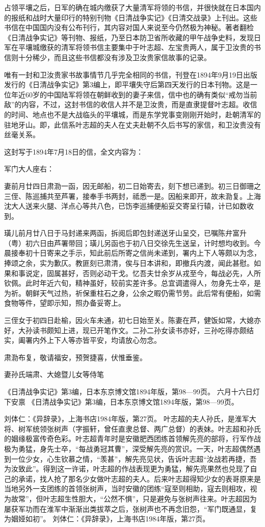 \documentclass[12pt,UTF8]{ctexbook}
\begin{document}
占领平壤之后，日军的确在城内缴获了大量清军将领的书信，并很快就在日本国内的报纸和战时大量印行的特别刊物《日清战争实记》《日清交战录》上刊出。这些书信在中国国内没有公布刊行，其内容对国人来说至今仍然极为神秘。著者翻检《日清战争实记》等刊物、报纸，乃至日本防卫省所收藏的甲午战争史料，发现日军在平壤城缴获的清军将领书信主要集中于叶志超、左宝贵两人，属于卫汝贵的书信则十分稀少，而且这些书信都没有涉及卫汝贵家信故事的记录。

唯有一封和卫汝贵家书故事情节几乎完全相同的书信，刊登在1894年9月19日出版发行的《日清战争实记》第3编上，即平壤失守后第四天发行的日本刊物。这是一位年近60岁的中国陆军将领在朝鲜收到的妻子来信，信中也的确有类似“戒勿当前敌”的内容，不过，这封书信的收信人并不是卫汝贵，而是直隶提督叶志超。收信的时间、地点也不是大战临头的平壤城，而是东学党事变刚刚开始时，赴朝清军的驻地牙山。即，此信系叶志超的夫人在丈夫赴朝不久后书写的家信，和卫汝贵没有丝毫关系。

这封写于1894年7月18日的信，全文内容为：

军门大人座右：

妻前月廿四日肃泐一函，因无邮船，初二日始寄去，刻下想已递到。初三日御珊之三侄、陈巡捕共至芦署，接奉手书两封，祗悉一是。因船来即开，故未泐复。上海沈大人送来火腿、洋点心等共八色，已饬李巡捕便船妥交寄呈行辕，计已如数收到。

璜儿前月廿八日于马封递来两函，拆阅后即包封递送牙山呈交，已嘱陈弁富升（粤）初六日由芦署带回；璜儿另函也于初八日交徐先生送呈，计时想均收到。今晨接奉初十日寄来之手示，知此前后所寄之信尚未递到，署内上下人等颇以为念，捧颂之余，实为歉仄。教匪刻已肃清，俟与日本讲和，即撤兵内渡，闻此甚慰。如果和事说定，固属甚好，否则必动干戈。忆吾夫廿余岁从戎至今，每战必先，人所钦佩。此时年近六旬，精神虽好，较前实差许多。总宜调遣得人，勿身先士卒，是为祈。朝鲜天气过热，祈保重柱石之身，公余之暇仍需节劳。此后常有便船，如需食物等件，望即示知，照办备妥寄上。

三侄女于初四日赴榆，因火车未通，初七日始至关。陈妻在芦，健饭如常，大媳亦好，大孙读书颇知上进，现已开笔作文。二孙二孙女读书亦好，三孙吃得亦颇结实，阖署内外上下人等亦皆平安，均请放心勿念。

肃泐布复，敬请福安，预贺捷喜，伏惟垂鉴。

妻孙氏端肃、大媳暨儿女等侍笔

《日清战争实记》第3编，日本东京博文馆1894年版，第98—99页。
六月十六日灯下安禀 《日清战争实记》第3编，日本东京博文馆1894年版，第98—99页。

刘体仁：《异辞录》，上海书店1984年版，第27页。
叶志超的夫人孙氏，是淮军大将、树军统领张树声（字振轩，曾任直隶总督、两广总督）的表妹。叶志超和孙氏的姻缘极富传奇色彩。叶志超青年时是安徽肥西团练首领解先亮的部将，行军作战极为勇猛，身先士卒，“每战勇冠其曹”，深受解先亮的赏识。一天，叶志超偶然遇到一位少女，心生钦慕之情，“羡甚”，解先亮见状，告诉叶志超“汝战若再捷，吾为汝致此”。得到这一许诺，叶志超的作战表现更为勇猛，解先亮果然也兑现了自己的承诺，找人抢了那名少女做叶志超的夫人。后来叶志超得知少女的表哥原来是当地另外一支团练的首领张树声，当时安徽的团练“寇至则相助，寇去则相攻，视为故常”，但叶志超生性胆大，“公然不惧”，只是避免与张树声往来。叶志超因为屡获军功而在淮军中渐渐出类拔萃之后，张树声也不再念旧怨，“军门既通显，复为姻娅如初”。 刘体仁：《异辞录》，上海书店1984年版，第27页。
\end{document}
